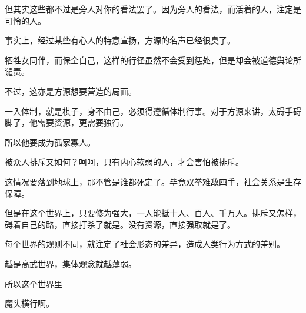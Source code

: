 \begin{this_body}
但其实这些都不过是旁人对你的看法罢了。因为旁人的看法，而活着的人，注定是可怜的人。

事实上，经过某些有心人的特意宣扬，方源的名声已经很臭了。

牺牲女同伴，而保全自己，这样的行径虽然不会受到惩处，但是却会被道德舆论所谴责。

不过，这亦是方源想要营造的局面。

一入体制，就是棋子，身不由己，必须得遵循体制行事。对于方源来讲，太碍手碍脚了，他需要资源，更需要独行。

所以他要成为孤家寡人。

被众人排斥又如何？呵呵，只有内心软弱的人，才会害怕被排斥。

这情况要落到地球上，那不管是谁都死定了。毕竟双拳难敌四手，社会关系是生存保障。

但是在这个世界上，只要修为强大，一人能抵十人、百人、千万人。排斥又怎样，碍着自己的路，直接打杀了就是。没有资源，直接强取就是了。

每个世界的规则不同，就注定了社会形态的差异，造成人类行为方式的差别。

越是高武世界，集体观念就越薄弱。

所以这个世界里——

魔头横行啊。

\end{this_body}

